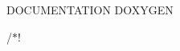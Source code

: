 D\+O\+C\+U\+M\+E\+N\+T\+A\+T\+I\+ON D\+O\+X\+Y\+G\+EN

/$\ast$!
\begin{DoxyItemize}
\item 
\end{DoxyItemize}